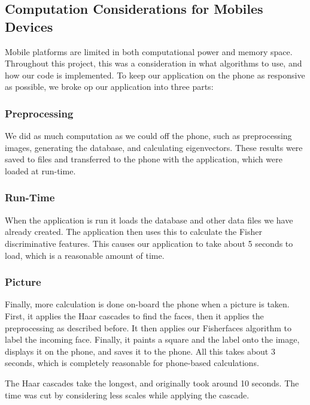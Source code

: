 \subsection{Computation Considerations for Mobiles Devices}


Mobile platforms are limited in both computational power
and memory space.  Throughout this project, this was a consideration in what algorithms to use, and how our code is implemented.  To keep our application on the phone as responsive as possible, we broke op our application into three parts:

\subsubsection{Preprocessing}

We did as much computation as we could off the phone, such as
preprocessing images, generating the database, and calculating
eigenvectors.  These results were saved to files and transferred to
the phone with the application, which were loaded at run-time.

\subsubsection{Run-Time}

When the application is run it loads the database and other data files
we have already created.  The application then uses this to calculate
the Fisher discriminative features.  This causes our application to
take about 5 seconds to load, which is a reasonable amount of time.

\subsubsection{Picture}

Finally, more calculation is done on-board the phone when a picture is
taken.  First, it applies the Haar cascades to find the faces, then it
applies the preprocessing as described before. It then applies our
Fisherfaces algorithm to label the incoming face.  Finally, it paints
a square and the label onto the image, displays it on the phone, and
saves it to the phone.  All this takes about 3 seconds, which is
completely reasonable for phone-based calculations.

The Haar cascades take the longest, and originally took around 10
seconds.  The time was cut by considering less scales while applying
the cascade.

